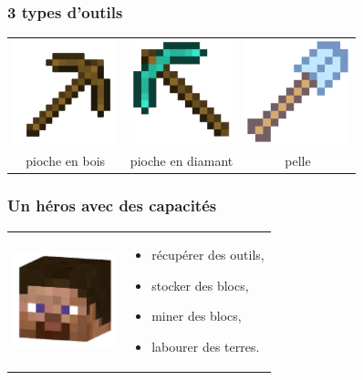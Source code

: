 \documentclass[svgnames,11pt]{beamer}
\begin{document}
\begin{frame}
    \frametitle{3 types d'outils}

    \begin{center}
        \begin{tabular}{ccc}
            \includegraphics[width=3cm]{ressources/wood_pickaxe.png}    &
            \includegraphics[width=3cm]{ressources/diamond_pickaxe.png} &
            \includegraphics[width=3cm]{ressources/shovel.png}                                      \\
            pioche en bois                                              & pioche en diamant & pelle \\
        \end{tabular}
    \end{center}

\end{frame}
\begin{frame}
    \frametitle{Un héros avec des capacités}

    \begin{center}
        \begin{tabular}{cp{}}
            \includegraphics[width=3cm]{ressources/head.png} &
            \begin{itemize}
                \item récupérer des outils,
                \item stocker des blocs,
                \item miner des blocs,
                \item labourer des terres.
            \end{itemize}                          \\
        \end{tabular}
    \end{center}

\end{frame}
\end{document}
